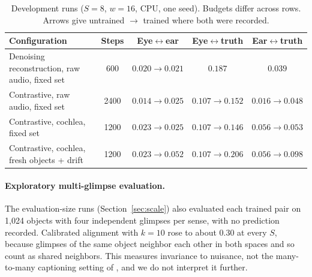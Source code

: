 \documentclass[11pt]{article}
\newcommand{\lr}{\ensuremath{\leftrightarrow}}
\begin{document}
\begin{table}[h]
  \centering
  \small
  \caption{Development runs ($S=8$, $w=16$, CPU, one seed). Budgets differ across rows. Arrows give untrained $\to$ trained where both were recorded.}
  \label{tab:explore}
  \begin{tabular}{lcccc}
    \toprule
    Configuration & Steps & Eye\lr{}ear & Eye\lr{}truth & Ear\lr{}truth \\
    \midrule
    Denoising reconstruction, raw audio, fixed set & 600 & $0.020 \to 0.021$ & $0.187$ & $0.039$ \\
    Contrastive, raw audio, fixed set & 2400 & $0.014 \to 0.025$ & $0.107 \to 0.152$ & $0.016 \to 0.048$ \\
    Contrastive, cochlea, fixed set & 1200 & $0.023 \to 0.025$ & $0.107 \to 0.146$ & $0.056 \to 0.053$ \\
    Contrastive, cochlea, fresh objects + drift & 1200 & $0.023 \to 0.052$ & $0.107 \to 0.206$ & $0.056 \to 0.098$ \\
    \bottomrule
  \end{tabular}
\end{table}

\paragraph{Exploratory multi-glimpse evaluation.} The evaluation-size runs (Section~\ref{sec:scale}) also evaluated each trained pair on 1{,}024 objects with four independent glimpses per sense, with no prediction recorded. Calibrated alignment with $k=10$ rose to about $0.30$ at every $S$, because glimpses of the same object neighbor each other in both spaces and so count as shared neighbors. This measures invariance to nuisance, not the many-to-many captioning setting of \citet{koepke2026cave}, and we do not interpret it further.
\end{document}
